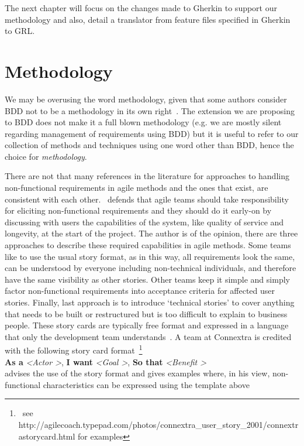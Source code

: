 \documentclass[dissertation,final]{softeng}
\newcommand{\nfrs}{non-functional requirements\xspace}
\begin{document}
The next chapter will focus on the changes made to Gherkin to support our methodology and also, detail a translator from feature files specified in Gherkin to GRL.

\section{Methodology}
We may be overusing the word methodology, given that some authors consider BDD not to be a methodology in its own right~\citep{Smart201410}. The extension we are proposing to BDD does not make it a full blown methodology (e.g. we are mostly silent regarding management of requirements using BDD) but it is useful to refer to our collection of methods and techniques using one word other than BDD, hence the choice for \emph{methodology}.

There are not that many references in the literature for approaches to handling non-functional requirements in agile methods and the ones that exist, are consistent with each other.~\citet{Davies} defends that agile teams should take responsibility for eliciting non-functional requirements and they should do it early-on by discussing with users the capabilities of the system, like quality of service and longevity, at the start of the project. The author is of the opinion, there are three approaches to describe these required capabilities in agile methods. Some teams like to use the usual story format, as in this way, all requirements look the same, can be understood by everyone including non-technical individuals, and therefore have the same visibility as other stories. Other teams keep it simple and simply factor \nfrs into acceptance criteria for affected user stories. Finally, last approach is to introduce `technical stories' to cover anything that needs to be built or restructured but is too difficult to explain to business people. These story cards are typically free format and expressed in a language that only the development team understands~\citep{Davies}. A team at Connextra is credited with the following story card format~\footnote{~see http://agilecoach.typepad.com/photos/connextra\_user\_story\_2001/connextrastorycard.html for examples}\\

\textbf{As a} \textit{\textless Actor \textgreater}, \textbf{I want} \textit{\textless Goal \textgreater}, \textbf{So that} \textit{\textless Benefit \textgreater} \\

\citet{CohnNFRS} advises the use of the story format and gives examples where, in his view, non-functional characteristics can be expressed using the template above
\end{document}
